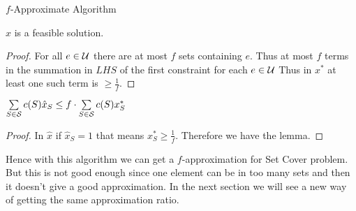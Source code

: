 \begin{algorithm}\DontPrintSemicolon
	\caption{$f$-Approximate Algorithm}
\end{algorithm}
\begin{lemma}{}{}
	$\hat{x}$ is a feasible solution.
\end{lemma}
\begin{proof}
	For all $e\in \mathcal{U}$ there are at most $f$ sets containing $e$. Thus at most $f$ terms in the summation in $LHS$ of the first constraint for each $e\in \mathcal{U}$ Thus in $x^*$ at least one such term is $\geq \frac1f$.
\end{proof}
\begin{lemma}{}{}
	$\sum\limits_{S\in \mathcal{S}}c(S)\hat{x}_S\leq f\cdot \sum\limits_{S\in\mathcal{S}}c(S)x^*_S$
\end{lemma}
\begin{proof}
	In $\hat{x}$ if $\hat{x}_S=1$ that means $x^*_S\geq \frac1f$. Therefore we have the lemma.
\end{proof}

Hence with this algorithm we can get a $f$-approximation for Set Cover problem. But this is not good enough since one element can be in too many sets and then it doesn't give a good approximation. In the next section we will see a new way of getting the same approximation ratio.


